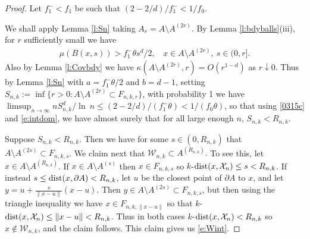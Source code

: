 \documentclass[12pt]{article}
\newcommand{\cW}{\mathcal{W}}
\newcommand{\X}{\mathcal{X}}
\newcommand{\dist}{{\rm dist}}
\renewcommand{\log}{{\ln \:}}
\begin{document}
\begin{proof} Let $f_1^- < f_1$ be such that
	$(2-2/d)/f_1^- < 1/f_0$. 

	We shall apply Lemma \ref{l:Sn} taking 
	 $A_r = A \setminus A^{(2r)} $. 
	 By Lemma \ref{l:bdyballs}(iii), for $r$ sufficiently small we have
	\begin{align*}
	\mu(B(x,s)) >  f_1^- \theta s^d/2,  ~~~~ x \in
		A \setminus A^{(2r)}, ~ s \in (0,r].  
		\end{align*}
	Also by Lemma \ref{l:Covbdy} we have
	$ \kappa ( A \setminus A^{(2r)},r  ) = O(r^{1-d}) $
		 as $r \downarrow 0$.
	Thus by Lemma \ref{l:Sn} %
	with $a=  f_1^- \theta/2$ and $b=d-1$, setting
	 $S_{n,k}:= \inf \{r >0: A \setminus A^{(2r)}
	\subset F_{n,k,r} \}$,  with probability 1 we have
	$\limsup_{ n \to \infty} nS_{n,k}^d/\log n \leq 
	(2-2/d) / ( f_1^- \theta) < 1/(f_0 \theta)$, so that 
	using  \eqref{0315c} and \eqref{e:intdom}, we have almost surely that
	for all large enough $n$, $S_{n,k} %
	< R_{n,k}$.

	Suppose $S_{n,k} < R_{n,k}$.
	Then we have for some $s  \in (0, R_{n,k})$
	that $A \setminus A^{(2s)}  \subset F_{n,k,s}$.
	We claim next that $
	\cW_{n,k} \subset 
	A^{(R_{n,k})}.$ 
	To see this, let $x \in A \setminus A^{(R_{n,k})}$.
	If $x \in A \setminus A^{(s)}$ then
	$x \in F_{n,k,s} $ so $k$-$\dist(x,\X_n) \leq s <R_{n,k}$.
	If instead $s \leq \dist(x,\partial A) < R_{n,k}$, let $u$ be the
	closest point of $\partial A$ to $x$, and let
	$y = u + \frac{s}{\|x -u\|} (x-u)$. Then
	$y \in A \setminus A^{(2s)}
	\subset F_{n,k,s}$, but then using the triangle inequality
	we have $x \in F_{n,k,\|x-u\|}$ 
	so that $k$-$\dist(x, \X_n) \leq \|x-u\| < R_{n,k}$.
	Thus in both cases $k$-$\dist(x,\X_n ) < R_{n,k}$ so
	$x \notin \cW_{n,k}$, 
	and the claim follows. This claim gives us \eqref{e:Wint}.
\end{proof}
\end{document}
